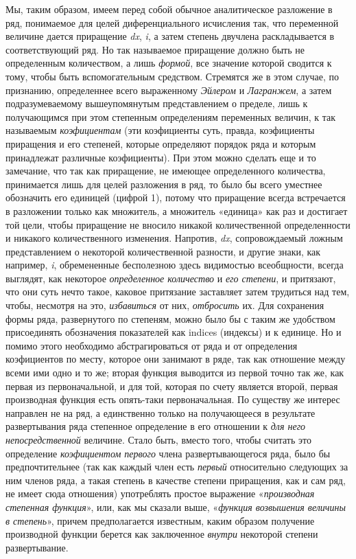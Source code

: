 {Мы, таким образом, имеем перед собой обычное аналитическое разложение в ряд,
понимаемое для целей диференциального исчисления так, что переменной
величине дается приращение {\em dx},
{\em i}, а затем степень двучлена раскладывается в
соответствующий ряд. Но так называемое приращение должно быть не
определенным количеством, а лишь {\em формой}, все
значение которой сводится к тому, чтобы быть вспомогательным средством.
Стремятся же в этом случае, по признанию, определеннее всего выраженному
{\em Эйлером} и {\em Лагранжем}, а
затем подразумеваемому вышеупомянутым представлением о пределе, лишь к
получающимся при этом степенным определениям переменных величин, к так
называемым {\em коэфициентам} (эти коэфициенты суть,
правда, коэфициенты приращения и его степеней, которые определяют порядок
ряда и которым принадлежат различные коэфициенты). При этом можно сделать
еще и то замечание, что так как приращение, не имеющее определенного
количества, принимается лишь для целей разложения в ряд, то было бы всего
уместнее обозначить его единицей (цифрой 1), потому что приращение всегда
встречается в разложении только как множитель, а множитель «единица» как
раз и достигает той цели, чтобы приращение не вносило никакой
количественной определенности и никакого количественного изменения.
Напротив, {\em dx}, сопровождаемый ложным
представлением о некоторой количественной разности, и другие знаки, как
например, {\em i}, обремененные бесполезною здесь
видимостью всеобщности, всегда выглядят, как некоторое
{\em определенное количество} и
{\em его степени}, и притязают, что они суть нечто
такое, каковое притязание заставляет затем трудиться над тем, чтобы,
несмотря на это, {\em избавиться} от них,
{\em отбросить} их. Для сохранения формы ряда,
развернутого по степеням, можно было бы с таким же удобством присоединять
обозначения показателей как indices (индексы) и к единице. Но и помимо
этого необходимо абстрагироваться от ряда и от определения коэфициентов по
месту, которое они занимают в ряде, так как отношение между всеми ими одно
и то же; вторая функция выводится из первой точно так же, как первая из
первоначальной, и для той, которая по счету является второй, первая
производная функция есть опять-таки первоначальная. По существу же интерес
направлен не на ряд, а единственно только на получающееся в результате
развертывания ряда степенное определение в его отношении к
{\em для него непосредственной} величине. Стало быть,
вместо того, чтобы считать это определение
{\em коэфициентом первого} члена развертывающегося
ряда, было бы предпочтительнее (так как каждый член есть
{\em первый} относительно следующих за ним членов ряда,
а такая степень в качестве степени приращения, как и сам ряд, не имеет сюда
отношения) употреблять простое выражение
«{\em производная степенная функция}», или, как мы
сказали выше, «{\em функция возвышения величины в
степень}», причем предполагается известным, каким образом получение
производной функции берется как заключенное
{\em внутри} некоторой степени развертывание.

}
